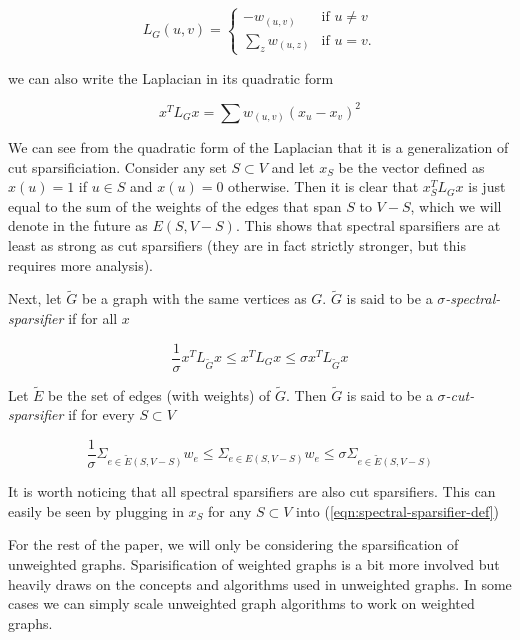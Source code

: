 \documentclass[12pt,twoside]{article}
\begin{document}
\begin{equation}
\label{eqn:laplacian-matrix-def}
L_G(u,v) = 
            \begin{cases} 
                -w_{(u,v)}           &\mbox{if } u \not= v \\
                \sum_z w_{(u,z)}     &\mbox{if } u = v. 
            \end{cases}
\end{equation}

we can also write the Laplacian in its quadratic form

\begin{equation}
\label{eqn:laplacian-vertex-def}
x^T L_G x = \sum w_{(u,v)} (x_u-x_v)^2
\end{equation}

We can see from the quadratic form of the Laplacian that it is a generalization of cut sparsificiation. Consider any set $S \subset V$ and let $x_S$ be the vector defined as $x(u) = 1$ if $u \in S$ and $x(u) = 0$ otherwise. Then it is clear that $x_S^T L_G x$ is just equal to the sum of the weights of the edges that span $S$ to $V - S$, which we will denote in the future as $E(S, V-S)$. This shows that spectral sparsifiers are at least as strong as cut sparsifiers (they are in fact strictly stronger, but this requires more analysis). 
 
Next, let $\tilde{G}$ be a graph with the same vertices as $G$. $\tilde{G}$ is said to be a \emph{$\sigma$-spectral-sparsifier} if for all $x$

\begin{equation}
\label{eqn:spectral-sparsifier-def}
\frac{1}{\sigma}x^T L_{\tilde{G}} x \leq x^T L_G x \leq \sigma x^T L_{\tilde{G}} x
\end{equation}


Let $\tilde{E}$ be the set of edges (with weights) of $\tilde{G}$. Then $\tilde{G}$ is said to be a \emph{$\sigma$-cut-sparsifier} if for every $S \subset V$

\begin{equation}
\label{eqn:cut-sparsifier-def}
\frac{1}{\sigma}\Sigma_{e \in \tilde{E}(S,V-S)} w_e \leq \Sigma_{e \in E(S,V-S)} w_e \leq \sigma \Sigma_{e \in \tilde{E}(S,V-S)}
\end{equation}

It is worth noticing that all spectral sparsifiers are also cut sparsifiers. This can easily be seen by plugging in $x_S$ for any $S \subset V$ into (\ref{eqn:spectral-sparsifier-def})

For the rest of the paper, we will only be considering the sparsification of unweighted graphs. Sparisification of weighted graphs is a bit more involved but heavily draws on the concepts and algorithms used in unweighted graphs. In some cases we can simply scale unweighted graph algorithms to work on weighted graphs. 
\end{document}
